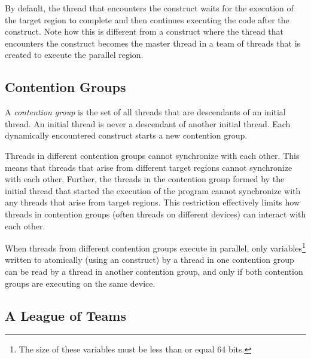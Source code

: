 By default, the thread that encounters the  construct waits for
the execution of the target region to complete and then continues executing the
code after the  construct.  Note how this is different from a
 construct where the thread that encounters the construct
becomes the master thread in a team of threads that is created to execute the
parallel region.  

\subsection{Contention Groups}
\label{ssec:06.contention-groups}

A \emph{contention group} is the set of all threads that are descendants of an
initial thread.  An initial thread is never a descendant of another initial
thread.  Each dynamically encountered  construct starts a new
contention group.  

Threads in different contention groups cannot synchronize with
each other.  This means that threads that arise from different target regions
cannot synchronize with each other.  Further, the threads in the contention
group formed by the initial thread that started the execution of the program
cannot synchronize with any threads that arise from target regions.  This
restriction effectively limits how threads in contention groups (often threads
on different devices) can interact with each other.

When threads from different contention groups execute in parallel, only
variables\footnote{The size of these variables must be less than or equal 64 bits.} 
written to atomically 
(using an  construct)
by a thread in one contention group can be read by a thread in another contention group, and only
if both contention groups are executing on the same device.

\subsection{A League of Teams}
\label{ssec:06.league-of-teams}

